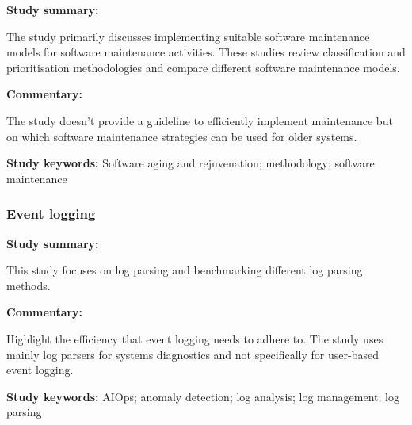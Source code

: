 \begin{tcolorbox}[colback=gray!5!white, colframe=deepblue!80!black, title=A Software Maintenance Methodology: An Approach Applied to Software Aging\cite{Araujo2021}]
	\begin{minipage}[t]{0.25\textwidth}
		\textbf{Study summary:}
	\end{minipage}
	\hfill
	\begin{minipage}[t]{0.65\textwidth}
		The study primarily discusses implementing suitable software maintenance models for software maintenance activities. These studies review classification and prioritisation methodologies and compare different software maintenance models.
	\end{minipage}

	\vspace{0.75em} 

	\begin{minipage}[t]{0.25\textwidth}
		\textbf{Commentary:}
	\end{minipage}
	\hfill
	\begin{minipage}[t]{0.65\textwidth}
		The study doesn't provide a guideline to efficiently implement maintenance but on which software maintenance strategies can be used for older systems.
	\end{minipage}
	\tcblower
	\textbf{Study keywords:} Software aging and rejuvenation; methodology; software maintenance
\end{tcolorbox}

\subsubsection{Event logging}

\begin{tcolorbox}[colback=gray!5!white, colframe=deepblue!80!black, title=Tools and Benchmarks for Automated Log Parsing\cite{Zhu2019}]
	\begin{minipage}[t]{0.25\textwidth}
		\textbf{Study summary:}
	\end{minipage}
	\hfill
	\begin{minipage}[t]{0.65\textwidth}
		This study focuses on log parsing and benchmarking different log parsing methods. 
	\end{minipage}

	\vspace{0.75em} 

	\begin{minipage}[t]{0.25\textwidth}
		\textbf{Commentary:}
	\end{minipage}
	\hfill
	\begin{minipage}[t]{0.65\textwidth}
		Highlight the efficiency that event logging needs to adhere to. The study uses mainly log parsers for systems diagnostics and not specifically for user-based event logging.
	\end{minipage}
	\tcblower
	\textbf{Study keywords:} AIOps; anomaly detection; log analysis; log management; log parsing
\end{tcolorbox}

